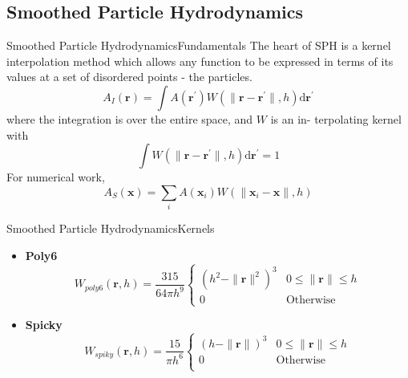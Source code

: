 \documentclass{beamer}
\begin{document}
\subsection{Smoothed Particle Hydrodynamics}

\begin{frame}{Smoothed Particle Hydrodynamics}{Fundamentals}
The heart of SPH is a kernel interpolation method which allows any function to be expressed in terms of its values at a set of disordered points - the particles.
\pause
\begin{equation}
        A_{I}(\textbf{r}) = \int A({\textbf{r}}^{\prime})W(\|\textbf{r} - \textbf{r}^{\prime}\|, h)\mathrm{d}\textbf{r}^{\prime}
\end{equation}
\pause
where the integration is over the entire space, and $W$ is an in-
terpolating kernel with
\pause
\begin{equation}
        \int W(\|\textbf{r} - \textbf{r}^{\prime}\|, h)\mathrm{d} \textbf{r}^{\prime} = 1
\end{equation}
For numerical work,
\pause
\begin{equation}
        A_{S}(\textbf{x}) = \sum_{i}A(\textbf{x}_{i})W(\|\textbf{x}_{i}-\textbf{x}\|, h)
\end{equation}

\end{frame}
\begin{frame}{Smoothed Particle Hydrodynamics}{Kernels}
\begin{itemize}
\item {
\textbf{Poly6}
\pause
\begin{equation}
        W_{poly 6}(\textbf{r}, h) = \frac{315}{64\pi h^{9}}
            \begin{cases}
                (h^2 - \|\textbf{r}\|^2)^3 & 0 \le \|\textbf{r}\| \le h \\
                0 & \textrm{Otherwise}
            \end{cases}
\end{equation}
\pause
}
\item {
\textbf{Spicky}
\pause
\begin{equation}
        W_{spiky}(\textbf{r}, h) = \frac{15}{\pi h^6}
            \begin{cases}
                (h - \|\textbf{r}\|)^3 & 0\le\|\textbf{r}\|\le h \\
                0 & \textrm{Otherwise}\\
            \end{cases}
\end{equation}
}
\end{itemize}
\end{frame}
\end{document}
